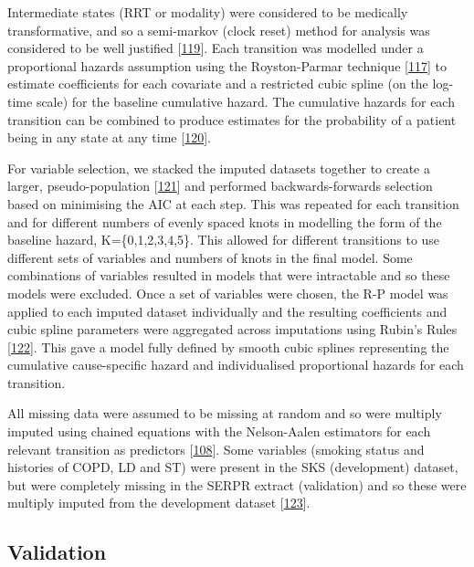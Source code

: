 \documentclass[12pt,PhD,twoside,openright]{muthesis}
\begin{document}
Intermediate states (RRT or modality) were considered to be medically transformative, and so a semi-markov (clock reset) method for analysis was considered to be well justified {[}\protect\hyperlink{ref-meira-machado_multi-state_2009}{119}{]}. Each transition was modelled under a proportional hazards assumption using the Royston-Parmar technique {[}\protect\hyperlink{ref-royston_flexible_2002}{117}{]} to estimate coefficients for each covariate and a restricted cubic spline (on the log-time scale) for the baseline cumulative hazard. The cumulative hazards for each transition can be combined to produce estimates for the probability of a patient being in any state at any time {[}\protect\hyperlink{ref-putter_tutorial_2007}{120}{]}.

For variable selection, we stacked the imputed datasets together to create a larger, pseudo-population {[}\protect\hyperlink{ref-wood_how_2008}{121}{]} and performed backwards-forwards selection based on minimising the AIC at each step. This was repeated for each transition and for different numbers of evenly spaced knots in modelling the form of the baseline hazard, K=\{0,1,2,3,4,5\}. This allowed for different transitions to use different sets of variables and numbers of knots in the final model. Some combinations of variables resulted in models that were intractable and so these models were excluded. Once a set of variables were chosen, the R-P model was applied to each imputed dataset individually and the resulting coefficients and cubic spline parameters were aggregated across imputations using Rubin's Rules {[}\protect\hyperlink{ref-rubin_multiple_1984}{122}{]}. This gave a model fully defined by smooth cubic splines representing the cumulative cause-specific hazard and individualised proportional hazards for each transition.

All missing data were assumed to be missing at random and so were multiply imputed using chained equations with the Nelson-Aalen estimators for each relevant transition as predictors {[}\protect\hyperlink{ref-white_imputing_2009}{108}{]}. Some variables (smoking status and histories of COPD, LD and ST) were present in the SKS (development) dataset, but were completely missing in the SERPR extract (validation) and so these were multiply imputed from the development dataset {[}\protect\hyperlink{ref-janssen_dealing_2009}{123}{]}.

\hypertarget{validation-2}{%
\subsection{Validation}\label{validation-2}}
\end{document}
